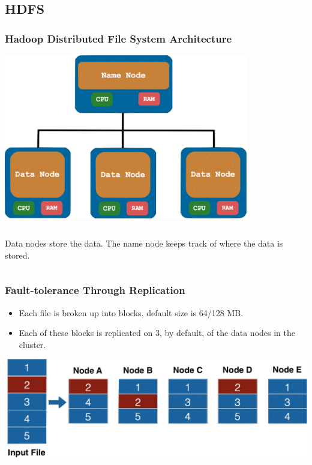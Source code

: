 \documentclass{beamer}
\begin{document}
\subsection{HDFS}
\begin{frame}
  \frametitle{Hadoop Distributed File System Architecture}
  \centering
  \includegraphics[width=0.8\textwidth]{../images/hdfs_architecture.png}
  \vspace{5mm}
  \begin{columns}
    Data nodes store the data.
    The name node keeps track of where the data is stored.
  \end{columns}
\end{frame}

\begin{frame}
  \frametitle{Fault-tolerance Through Replication}
  \begin{itemize}
    \item Each file is broken up into blocks, default size is 64/128 MB.
    \item Each of these blocks is replicated on 3, by default, of the data nodes in the cluster.
  \end{itemize} \pause
  \vspace{3mm}
  \includegraphics[width=\textwidth]{../images/replication.png}
  \vspace{1mm}
\end{frame}
\end{document}

